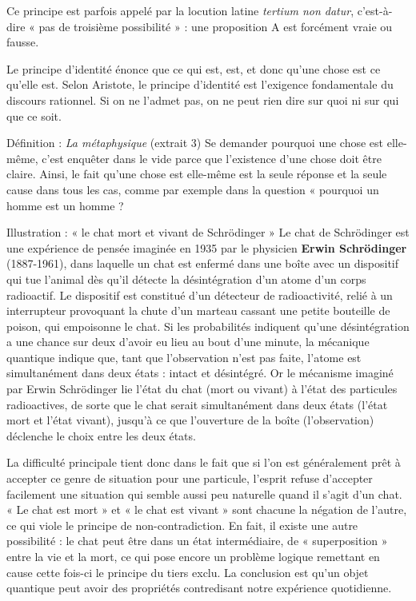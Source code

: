 Ce principe est parfois appelé par la locution latine \textit{tertium non datur}, c’est-à-dire « pas de troisième possibilité » : une proposition A est forcément vraie ou fausse.

Le principe d’identité énonce que ce qui est, est, et donc qu’une chose est ce qu’elle est. Selon Aristote, le principe d’identité est l’exigence fondamentale du discours rationnel. Si on ne l’admet pas, on ne peut rien dire sur quoi ni sur qui que ce soit.

\begin{lecture}{Définition : \textit{La métaphysique} (extrait 3)}
Se demander pourquoi une chose est elle-même, c’est enquêter dans le vide parce que l’existence d’une chose doit être claire. Ainsi, le fait qu’une chose est elle-même est la seule réponse et la seule cause dans tous les cas, comme par exemple dans la question « pourquoi un homme est un homme ?
\end{lecture}

\begin{bbcomplement}{Illustration : « le chat mort et vivant de Schrödinger »}
Le chat de Schrödinger est une expérience de pensée imaginée en 1935 par le physicien \textbf{Erwin Schrödinger} (1887-1961), dans laquelle un chat est enfermé dans une boîte avec un dispositif qui tue l’animal dès qu’il détecte la désintégration d’un atome d’un corps radioactif. Le dispositif est constitué d’un détecteur de radioactivité, relié à un interrupteur provoquant la chute d’un marteau cassant une petite bouteille de poison, qui empoisonne le chat. Si les probabilités indiquent qu’une désintégration a une chance sur deux d’avoir eu lieu au bout d’une minute, la mécanique quantique indique que, tant que l’observation n’est pas faite, l’atome est simultanément dans deux états : intact et désintégré. Or le mécanisme imaginé par Erwin Schrödinger lie l’état du chat (mort ou vivant) à l’état des particules radioactives, de sorte que le chat serait simultanément dans deux états (l’état mort et l’état vivant), jusqu’à ce que l’ouverture de la boîte (l’observation) déclenche le choix entre les deux états.

La difficulté principale tient donc dans le fait que si l’on est généralement prêt à accepter ce genre de situation pour une particule, l’esprit refuse d’accepter facilement une situation qui semble aussi peu naturelle quand il s’agit d’un chat. « Le chat est mort » et « le chat est vivant » sont chacune la négation de l’autre, ce qui viole le principe de non-contradiction. En fait, il existe une autre possibilité : le chat peut être dans un état intermédiaire, de « superposition » entre la vie et la mort, ce qui pose encore un problème logique remettant en cause cette fois-ci le principe du tiers exclu. La conclusion est qu’un objet quantique peut avoir des propriétés contredisant notre expérience quotidienne.
\end{bbcomplement}

